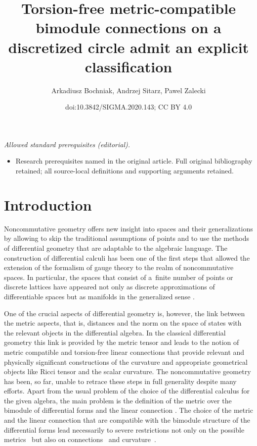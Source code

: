 \documentclass[10pt,a4paper]{amsart}
\title{Torsion-free metric-compatible bimodule connections on a discretized circle admit an explicit classification}
\author{Arkadiusz Bochniak, Andrzej Sitarz, Pawel Zalecki}
\date{doi:10.3842/SIGMA.2020.143; CC BY 4.0}
\numberwithin{equation}{section}
\begin{document}
\maketitle
\noindent\textit{Allowed standard prerequisites (editorial).}\begin{itemize}
\item Research prerequisites named in the original article. Full original bibliography retained; all source-local definitions and supporting arguments retained.
\end{itemize}\medskip
\section{Introduction}

Noncommutative geometry \cite{BM_book,Connes:1994bk, La:bk} offers new insight into spaces and their generalizations
by allowing to skip the traditional assumptions of points and to use the methods of differential geometry that are
adaptable to the algebraic language. The construction of differential calculi has been one of the first steps that allowed
the extension of the formalism of gauge theory to the realm of noncommutative spaces. In particular, the spaces that consist
of a~finite number of points or discrete lattices have appeared not only as discrete approximations of differentiable spaces
but as manifolds in the generalized sense \cite{Balachandran:1996, BHDS, DMH}.

One of the crucial aspects of differential geometry is, however, the link between
the metric aspects, that is, distances and the norm on the space of states with the
relevant objects in the differential algebra. In the classical differential geometry this link
is provided by the metric tensor and leads to the notion of metric compatible and
torsion-free linear connections that provide relevant and physically significant constructions
of the curvature and appropriate geometrical objects like Ricci tensor and the scalar curvature.
The noncommutative geometry has been, so far, unable to retrace these steps
in full generality despite many efforts. Apart from the usual problem of the choice of
the differential calculus for the given algebra, the main problem is the definition of
the metric over the bimodule of differential forms and the linear connection \cite{MMM,mourad}.
The choice of the metric and the linear connection that are compatible with the bimodule structure
of the differential forms lead necessarily to severe restrictions not only on the possible
metrics~\cite{Si94} but also on connections~\cite{DM94} and curvature~\cite{DMM96}.
\end{document}
